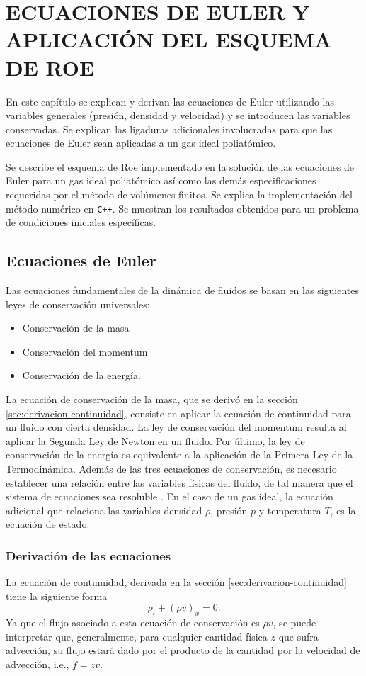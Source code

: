 \chapter{ECUACIONES DE EULER Y APLICACIÓN DEL ESQUEMA DE ROE}

En este capítulo se explican y derivan las ecuaciones de Euler utilizando las variables generales (presión, densidad y velocidad) y se introducen las variables conservadas. Se explican las ligaduras adicionales involucradas para que las ecuaciones de Euler sean aplicadas a un gas ideal poliatómico.

Se describe el esquema de Roe implementado en la solución de las ecuaciones de Euler para un gas ideal poliatómico así como las demás especificaciones requeridas por el método de volúmenes finitos. Se explica la implementación del método numérico en \texttt{C++}. Se muestran los resultados obtenidos para un problema de condiciones iniciales específicas.
\section{Ecuaciones de Euler}
Las ecuaciones fundamentales de la dinámica de fluidos se basan en las siguientes leyes de conservación universales:
\begin{itemize}
	\item Conservación de la masa
	\item Conservación del momentum
	\item Conservación de la energía.
\end{itemize}
La ecuación de conservación de la masa, que se derivó en la sección \ref{sec:derivacion-continuidad}, consiste en aplicar la ecuación de continuidad para un fluido con cierta densidad. La ley de conservación del momentum resulta al aplicar la Segunda Ley de Newton en un fluido. Por último, la ley de conservación de la energía es equivalente a la aplicación de la Primera Ley de la Termodinámica. Además de las tres ecuaciones de conservación, es necesario establecer una relación entre las variables físicas del fluido, de tal manera que el sistema de ecuaciones sea resoluble \cite{heattransfer}. En el caso de un gas ideal, la ecuación adicional que relaciona las variables densidad $\rho$, presión $p$ y temperatura $T$, es la ecuación de estado. 
\subsection{Derivación de las ecuaciones}
La ecuación de continuidad, derivada en la sección \ref{sec:derivacion-continuidad} tiene la siguiente forma
\begin{equation}
	\rho_{t} + (\rho v)_{x} = 0.
	\label{eq:continuidad-euler}
\end{equation}
Ya que el flujo asociado a esta ecuación de conservación es $\rho v$, se puede interpretar que, generalmente, para cualquier cantidad física $z$ que sufra advección, su flujo estará dado por el producto de la cantidad por la velocidad de advección, i.e., $f=zv$. 


